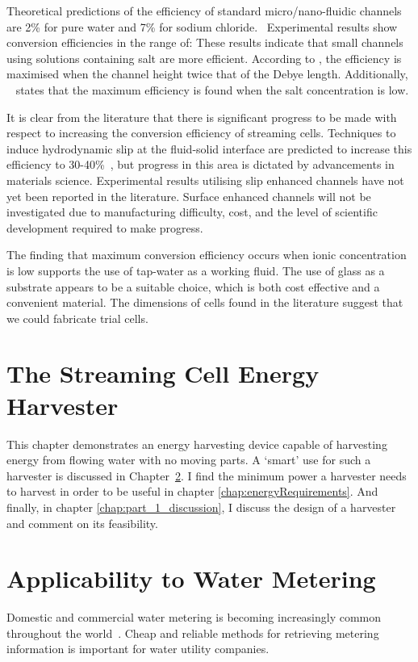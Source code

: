     Theoretical predictions of the efficiency of standard micro/nano-fluidic channels are 2\% for pure water and 7\% for sodium chloride.~\cite{VanderHeyden2006}
    Experimental results show conversion efficiencies in the range of:
    These results indicate that small channels using solutions containing salt are more efficient.
    According to \cite{Daiguji2004}, the efficiency is maximised when the channel height twice that of the Debye length.
    Additionally, ~\cite{VanderHeyden2006} states that the maximum efficiency is found when the salt concentration is low.

    It is clear from the literature that there is significant progress to be made with respect to increasing the conversion efficiency of streaming cells.
    Techniques to induce hydrodynamic slip at the fluid-solid interface are predicted to increase this efficiency to 30-40\%~\cite{Davidson2008a, Ren2008}, but progress in this area is dictated by advancements in materials science.
    Experimental results utilising slip enhanced channels have not yet been reported in the literature.
    Surface enhanced channels will not be investigated due to manufacturing difficulty, cost, and the level of scientific development required to make progress.

    The finding that maximum conversion efficiency occurs when ionic concentration is low supports the use of tap-water as a working fluid.
    The use of glass as a substrate appears to be a suitable choice, which is both cost effective and a convenient material.
    The dimensions of cells found in the literature suggest that we could fabricate trial cells.


\chapter{The Streaming Cell Energy Harvester}
  \label{chap:harvestingEnergy}

  This chapter demonstrates an energy harvesting device capable of harvesting energy from flowing water with no moving parts.
  A `smart' use for such a harvester is discussed in Chapter~\ref{chap:wirelessWaterMetering}.
  I find the minimum power a harvester needs to harvest in order to be useful in chapter \ref{chap:energyRequirements}.
  And finally, in chapter \ref{chap:part_1_discussion}, I discuss the design of a harvester and comment on its feasibility.

  

\chapter{Applicability to Water Metering}
  \label{chap:wirelessWaterMetering}
  Domestic and commercial water metering is becoming increasingly common throughout the world~\cite{Chang2012}.
  Cheap and reliable methods for retrieving metering information is important for water utility companies.

